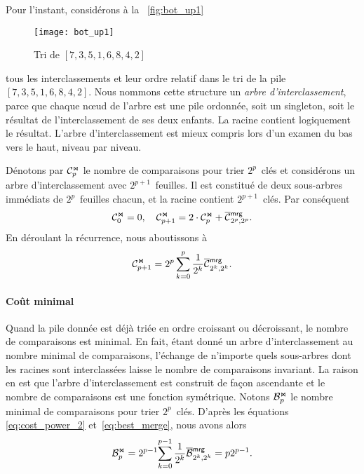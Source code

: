 Pour l'instant, considérons à la \fig~\vref{fig:bot_up1}
\begin{figure}
\centering
\texttt{[image: bot\_up1]}
\caption{Tri de \([7,3,5,1,6,8,4,2]\)}
\label{fig:bot_up1}
\end{figure}
tous les interclassements et leur ordre relatif dans le tri de la pile
\([7, 3, 5, 1, 6, 8, 4, 2]\). Nous nommons cette structure un
\emph{arbre d'interclassement}, parce que
chaque n{\oe}ud de l'arbre est une pile ordonnée, soit un singleton,
soit le résultat de l'interclassement de ses deux enfants. La racine
contient logiquement le résultat. L'arbre d'interclassement est mieux
compris lors d'un examen du bas vers le haut, niveau par
niveau.

Dénotons par \(\mathcal{C}_{p}^{\Join}\) le nombre de comparaisons pour trier
\(2^p\)~clés et considérons un arbre d'interclassement avec
\(2^{p+1}\)~feuilles. Il est constitué de deux sous-arbres immédiats
de \(2^p\)~feuilles chacun, et la racine contient
\(2^{p+1}\)~clés. Par conséquent
\begin{equation*}
\C{\Join}{0} = 0,
\quad
\C{\Join}{p+1} = 2 \cdot \C{\Join}{p} + \OC{\fun{mrg}}{2^p,2^p}.
\end{equation*}
En déroulant la récurrence, nous aboutissons à
\begin{equation}
\C{\Join}{p+1}
  = 2^p\sum_{k=0}^p{\frac{1}{2^k}\OC{\fun{mrg}}{2^k,2^k}}.
\index{mrg@$\C{\Join}{n}$}
\label{eq:cost_power_2}
\end{equation}

\paragraph{Coût minimal}

Quand la pile donnée est déjà triée en ordre croissant ou décroissant,
le nombre de comparaisons est minimal. En fait, étant donné un arbre
d'interclassement au nombre minimal de comparaisons,
 l'échange de n'importe quels
sous-arbres dont les racines sont interclassées laisse le nombre de
comparaisons invariant. La raison en est que l'arbre d'interclassement
est construit de façon ascendante et le nombre de comparaisons est une
fonction symétrique.  Notons \(\mathcal{B}_{p}^{\Join}\) le nombre minimal de
comparaisons pour trier \(2^p\)~clés. D'après les équations
\eqref{eq:cost_power_2} et~\eqref{eq:best_merge}, nous avons alors
\begin{equation}
\B{\Join}{p}
  = 2^{p-1}\!\sum_{k=0}^{p-1}{\frac{1}{2^k}\OB{\fun{mrg}}{2^k,2^k}}
  = p2^{p-1}.\label{eq:best_power}\index{mrg@$\B{\Join}{n}$}
\end{equation}


